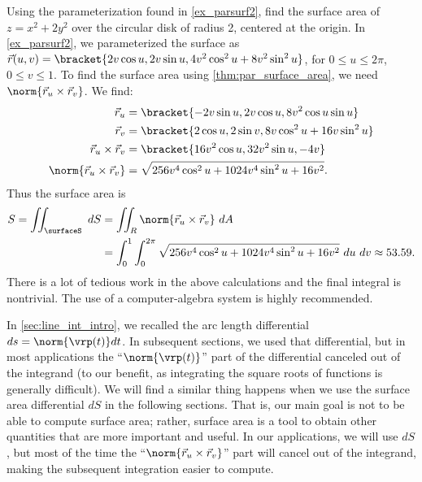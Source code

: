 
\begin{example}\label{ex_parsurfarea1}
Using the parameterization found in \autoref{ex_parsurf2}, find the surface area of $z=x^2+2y^2$ over the circular disk of radius 2, centered at the origin.
\solution
In \autoref{ex_parsurf2}, we parameterized the surface as $\vec r(u,v) =\\ \bracket{2v\cos u, 2v\sin u, 4v^2\cos^2u+8v^2\sin^2u}$, for $0\leq u\leq 2\pi$, $0\leq v\leq 1$. To find the surface area using \autoref{thm:par_surface_area}, we need $\norm{\vec r_u\times\vec r_v}$. We find:
\begin{align*}
\vec r_u &= \bracket{-2v\sin u, 2v\cos u, 8v^2\cos u\sin u}\\
\vec r_v &= \bracket{2\cos u, 2\sin v, 8v\cos^2 u+16v\sin^2u}\\
\vec r_u\times\vec r_v &= \bracket{16v^2\cos u, 32v^2\sin u, -4v}\\
\norm{\vec r_u\times\vec r_v} &= \sqrt{256v^4\cos^2u+1024v^4\sin^2u+16v^2}.
\end{align*}
Thus the surface area is
\begin{align*}
S = \iint_\surfaceS \ dS &= \iint_R\norm{\vec r_u\times \vec r_v}\ dA \\
& = \int_0^1\int_0^{2\pi} \sqrt{256v^4\cos^2u+1024v^4\sin^2u+16v^2}\ du\ dv \approx 53.59.
\end{align*}
There is a lot of tedious work in the above calculations and the final integral is nontrivial. The use of a computer-algebra system is highly recommended.
\end{example}

In \autoref{sec:line_int_intro}, we recalled the arc length differential $ds=\norm{\vrp(t)}dt$. In subsequent sections, we used that differential, but in most applications the ``$\norm{\vrp(t)}$'' part of the differential canceled out of the integrand (to our benefit, as integrating the square roots of functions is generally difficult). We will find a similar thing happens when we use the surface area differential $dS$ in the following sections. That is, our main goal is not to be able to compute surface area; rather, surface area is a tool to obtain other quantities that are more important and useful. In our applications, we will use $dS$, but most of the time the ``$\norm{\vec r_u\times \vec r_v}$'' part will cancel out of the integrand, making the subsequent integration easier to compute.

